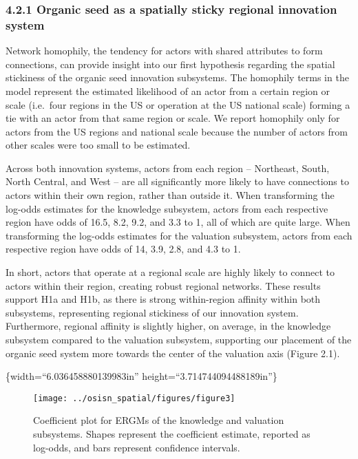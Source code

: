 \documentclass[twoside,12pt,final]{ucthesis-CA2012}
\begin{document}
\begin{ucmainmatter}
{\subsubsection{4.2.1 Organic seed as a spatially sticky regional innovation system}\label{organic-seed-as-a-spatially-sticky-regional-innovation-system}}

Network \textquotesingle homophily\textquotesingle, the tendency for actors with shared attributes to
form connections, can provide insight into our first hypothesis
regarding the spatial stickiness of the organic seed innovation
subsystems. The homophily terms in the model represent the estimated
likelihood of an actor from a certain region or scale (i.e.~four regions
in the US or operation at the US national scale) forming a tie with an
actor from that same region or scale. We report homophily only for
actors from the US regions and national scale because the number of
actors from other scales were too small to be estimated.

Across both innovation systems, actors from each region -- Northeast,
South, North Central, and West -- are all significantly more likely to
have connections to actors within their own region, rather than outside
it. When transforming the log-odds estimates for the knowledge
subsystem, actors from each respective region have odds of 16.5, 8.2,
9.2, and 3.3 to 1, all of which are quite large. When transforming the
log-odds estimates for the valuation subsystem, actors from each
respective region have odds of 14, 3.9, 2.8, and 4.3 to 1.

In short, actors that operate at a regional scale are highly likely to
connect to actors within their region, creating robust regional
networks. These results support H1a and H1b, as there is strong
within-region affinity within both subsystems, representing regional
stickiness of our innovation system. Furthermore, regional affinity is
slightly higher, on average, in the knowledge subsystem compared to the
valuation subsystem, supporting our placement of the organic seed system
more towards the center of the valuation axis (Figure 2.1).

\{width=``6.036458880139983in''
height=``3.714744094488189in''\}
\begin{figure}

{\centering \texttt{[image: ../osisn\_spatial/figures/figure3]} 

}

\caption{Coefficient plot for ERGMs of the knowledge and valuation subsystems. Shapes represent the coefficient estimate, reported as log-odds, and bars represent confidence intervals.}\label{fig:unnamed-chunk-20}
\end{figure}
\hypertarget{vertical-coupling-via-national-scale-bridges}{%
}
\end{ucmainmatter}
\end{document}
